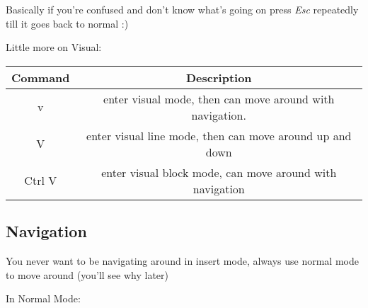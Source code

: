 \documentclass[12pt, letterpaper]{article}
\begin{document}
Basically if you're confused and don't know what's going on press \textit{Esc} repeatedly till it goes back to normal :)


Little more on Visual:

\begin{table}[H]
    \begin{tabular}{|c|c|}
        Command & Description \\
        \hline
        v & enter visual mode, then can move around with navigation. \\
        V & enter visual line mode, then can move around up and down \\
        Ctrl V& enter visual block mode, can move around with navigation \\
    \end{tabular}
\end{table}



\subsection{Navigation}
You never want to be navigating around in insert mode, always use normal mode to move around (you'll see why later)

In Normal Mode:
\end{document}
